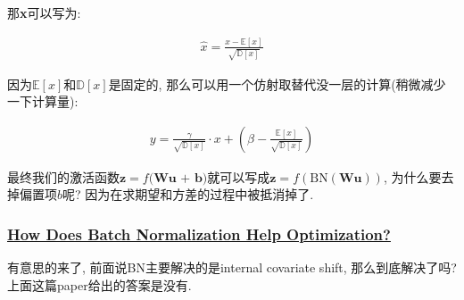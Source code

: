 \documentclass{article}
\begin{document}
那\textbf{x}可以写为:

\begin{align}
    \hat{x} = \frac{x - \mathbb{E}[x]}{\sqrt{\mathbb{D}[x]}}
\end{align}

因为$\mathbb{E}[x]$和$\mathbb{D}[x]$是固定的, 那么可以用一个仿射取替代没一层的计算(稍微减少一下计算量):

\begin{align}
    y = \tfrac{\gamma}{\sqrt{\mathbb{D}[x]}} \cdot x + (\beta - \tfrac{\mathbb{E}[x]}{\sqrt{\mathbb{D}[x]}})
\end{align}

最终我们的激活函数$\textbf{z} = f\textbf{(Wu + b)}$就可以写成$\textbf{z} = f(\text{BN}(\textbf{Wu}))$, 为什么要去掉偏置项$b$呢? 因为在求期望和方差的过程中被抵消掉了.

\subsubsection{\href{http://arxiv.org/abs/1805.11604}{How Does Batch Normalization Help Optimization?}}

有意思的来了, 前面说BN主要解决的是internal covariate shift, 那么到底解决了吗?
上面这篇paper给出的答案是没有.
\end{document}
